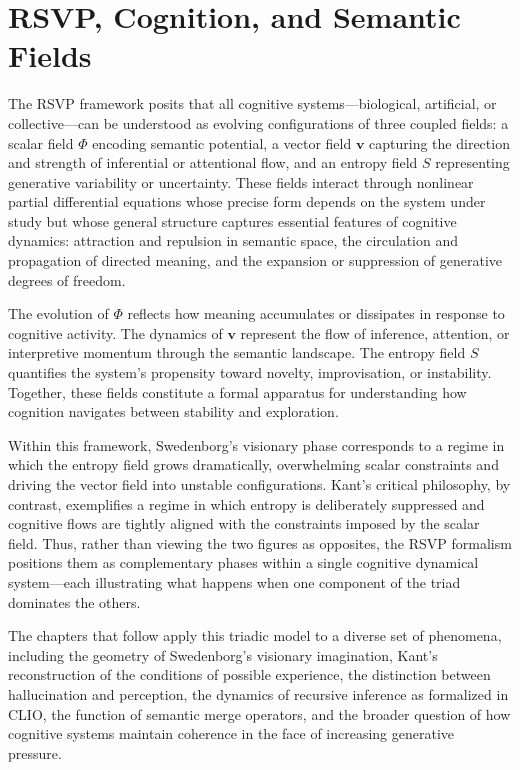 \documentclass[12pt]{article}
\begin{document}
\section{RSVP, Cognition, and Semantic Fields}

The RSVP framework posits that all cognitive systems—biological, artificial, or 
collective—can be understood as evolving configurations of three coupled 
fields: a scalar field $\Phi$ encoding semantic potential, a vector field 
$\mathbf{v}$ capturing the direction and strength of inferential or attentional 
flow, and an entropy field $S$ representing generative variability or 
uncertainty.  
These fields interact through nonlinear partial differential equations whose 
precise form depends on the system under study but whose general structure 
captures essential features of cognitive dynamics: attraction and repulsion in 
semantic space, the circulation and propagation of directed meaning, and the 
expansion or suppression of generative degrees of freedom.

The evolution of $\Phi$ reflects how meaning accumulates or dissipates in response to 
cognitive activity. The dynamics of $\mathbf{v}$ represent the flow of inference, 
attention, or interpretive momentum through the semantic landscape. The 
entropy field $S$ quantifies the system’s propensity toward novelty, 
improvisation, or instability.  
Together, these fields constitute a formal apparatus for understanding how 
cognition navigates between stability and exploration.

Within this framework, Swedenborg’s visionary phase corresponds to a regime in 
which the entropy field grows dramatically, overwhelming scalar constraints and 
driving the vector field into unstable configurations. Kant’s critical 
philosophy, by contrast, exemplifies a regime in which entropy is deliberately 
suppressed and cognitive flows are tightly aligned with the constraints imposed 
by the scalar field.  
Thus, rather than viewing the two figures as opposites, the RSVP formalism 
positions them as complementary phases within a single cognitive dynamical 
system—each illustrating what happens when one component of the triad 
dominates the others.

The chapters that follow apply this triadic model to a diverse set of 
phenomena, including the geometry of Swedenborg’s visionary imagination, 
Kant’s reconstruction of the conditions of possible experience, the 
distinction between hallucination and perception, the dynamics of recursive 
inference as formalized in CLIO, the function of semantic merge operators, and 
the broader question of how cognitive systems maintain coherence in the face of 
increasing generative pressure.
\end{document}
